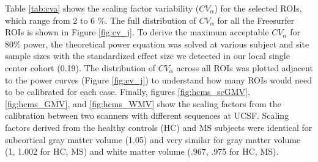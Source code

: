 Table \ref{tab:cva} shows the scaling factor variability ($CV_{\alpha}$) for the selected ROIs, which range from 2 to 6 \%. The full distribution of $CV_{\alpha}$ for all the Freesurfer ROIs is shown in Figure \ref{fig:cv_j}. To derive the maximum acceptable $CV_{\alpha}$ for 80\% power, the theoretical power equation was solved at various subject and site sample sizes with the standardized effect size we detected in our local single center cohort (0.19). The distribution of $CV_{\alpha}$ across all ROIs was plotted adjacent to the power curves (Figure \ref{fig:cv_j}) to understand how many ROIs would need to be calibrated for each case. Finally, figures \ref{fig:hcms_scGMV}, \ref{fig:hcms_GMV}, and \ref{fig:hcms_WMV} show the scaling factors from the calibration between two scanners with different sequences at UCSF. Scaling factors derived from the healthy controls (HC) and MS subjects were identical for subcortical gray matter volume (1.05) and very similar for gray matter volume (1, 1.002 for HC, MS) and white matter volume (.967, .975 for HC, MS).